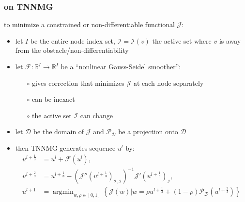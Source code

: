 \documentclass{beamer}
\newcommand{\RR}{\mathbb{R}}
\begin{document}
\begin{frame}
  \frametitle{on TNNMG}

\small
to minimize a constrained or non-differentiable functional $\mathcal{J}$:
\begin{itemize}
\item let $I$ be the entire node index set, $\mathcal{I}=\mathcal{I}(v)$ the active set where $v$ is away from the obstacle/non-differentiability
\item let $\mathcal{F}:\RR^I \to \RR^I$ be a ``nonlinear Gauss-Seidel smoother'':
  \begin{itemize}
  \item[$\circ$]  gives correction that minimizes $\mathcal{J}$ at each node separately
  \item[$\circ$]  can be inexact
  \item[$\circ$]  the active set $\mathcal{I}$ can change
  \end{itemize}
\item let $\mathcal{D}$ be the domain of $\mathcal{J}$ and $\mathcal{P}_{\mathcal{D}}$ be a projection onto $\mathcal{D}$
\item then TNNMG generates sequence $u^l$ by:
\begin{align*}
  u^{l+\frac13} &= u^l + \mathcal{F}(u^l), \\
  u^{l+\frac23} &= u^{l+\frac13} - \left(\mathcal{J}''(u^{l+\frac13})_{\mathcal{I},\mathcal{I}}\right)^{-1} \mathcal{J}'(u^{l+\frac13})_{\mathcal{I}}, \\
  u^{l+1}       &= \operatorname{argmin}_{w,\rho\in[0,1]} \left\{\mathcal{J}(w) \big| w= \rho u^{l+\frac13} + (1-\rho) \mathcal{P}_{\mathcal{D}}(u^{l+\frac23}) \right\}
\end{align*}
\end{itemize}
\end{frame}
\end{document}
